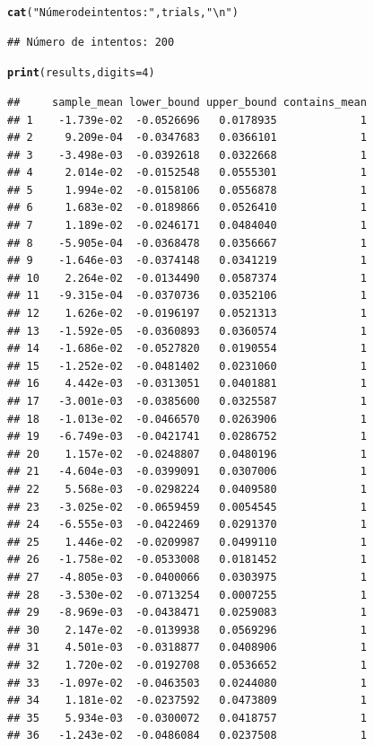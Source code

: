 \documentclass[12pt]{article}\usepackage[]{graphicx}\usepackage[]{xcolor}
\makeatletter
\newcommand{\hlnum}[1]{\textcolor[rgb]{0.686,0.059,0.569}{#1}}%
\newcommand{\hlsng}[1]{\textcolor[rgb]{0.192,0.494,0.8}{#1}}%
\newcommand{\hldef}[1]{\textcolor[rgb]{0.345,0.345,0.345}{#1}}%
\newcommand{\hlkwc}[1]{\textcolor[rgb]{0.333,0.667,0.333}{#1}}%
\newcommand{\hlkwd}[1]{\textcolor[rgb]{0.737,0.353,0.396}{\textbf{#1}}}%
\newenvironment{kframe}{%
 \def\at@end@of@kframe{}%
 \ifinner\ifhmode%
  \def\at@end@of@kframe{\end{minipage}}%
  \begin{minipage}{\columnwidth}%
 \fi\fi%
 \def\FrameCommand##1{\hskip\@totalleftmargin \hskip-\fboxsep
 \colorbox{shadecolor}{##1}\hskip-\fboxsep
     \hskip-\linewidth \hskip-\@totalleftmargin \hskip\columnwidth}%
 \MakeFramed {\advance\hsize-\width
   \@totalleftmargin\z@ \linewidth\hsize
   \@setminipage}}%
 {\par\unskip\endMakeFramed%
 \at@end@of@kframe}
\newenvironment{knitrout}{}{} %
\makeatother
\begin{document}
\begin{knitrout}
\begin{kframe}
\begin{alltt}
\hlkwd{cat}\hldef{(}\hlsng{"Número de intentos:"}\hldef{, trials,} \hlsng{"\textbackslash{}n"}\hldef{)}
\end{alltt}
\begin{verbatim}
## Número de intentos: 200
\end{verbatim}
\begin{alltt}
\hlkwd{print}\hldef{(results,} \hlkwc{digits}\hldef{=} \hlnum{4}\hldef{)}
\end{alltt}
\begin{verbatim}
##     sample_mean lower_bound upper_bound contains_mean
## 1    -1.739e-02  -0.0526696   0.0178935             1
## 2     9.209e-04  -0.0347683   0.0366101             1
## 3    -3.498e-03  -0.0392618   0.0322668             1
## 4     2.014e-02  -0.0152548   0.0555301             1
## 5     1.994e-02  -0.0158106   0.0556878             1
## 6     1.683e-02  -0.0189866   0.0526410             1
## 7     1.189e-02  -0.0246171   0.0484040             1
## 8    -5.905e-04  -0.0368478   0.0356667             1
## 9    -1.646e-03  -0.0374148   0.0341219             1
## 10    2.264e-02  -0.0134490   0.0587374             1
## 11   -9.315e-04  -0.0370736   0.0352106             1
## 12    1.626e-02  -0.0196197   0.0521313             1
## 13   -1.592e-05  -0.0360893   0.0360574             1
## 14   -1.686e-02  -0.0527820   0.0190554             1
## 15   -1.252e-02  -0.0481402   0.0231060             1
## 16    4.442e-03  -0.0313051   0.0401881             1
## 17   -3.001e-03  -0.0385600   0.0325587             1
## 18   -1.013e-02  -0.0466570   0.0263906             1
## 19   -6.749e-03  -0.0421741   0.0286752             1
## 20    1.157e-02  -0.0248807   0.0480196             1
## 21   -4.604e-03  -0.0399091   0.0307006             1
## 22    5.568e-03  -0.0298224   0.0409580             1
## 23   -3.025e-02  -0.0659459   0.0054545             1
## 24   -6.555e-03  -0.0422469   0.0291370             1
## 25    1.446e-02  -0.0209987   0.0499110             1
## 26   -1.758e-02  -0.0533008   0.0181452             1
## 27   -4.805e-03  -0.0400066   0.0303975             1
## 28   -3.530e-02  -0.0713254   0.0007255             1
## 29   -8.969e-03  -0.0438471   0.0259083             1
## 30    2.147e-02  -0.0139938   0.0569296             1
## 31    4.501e-03  -0.0318877   0.0408906             1
## 32    1.720e-02  -0.0192708   0.0536652             1
## 33   -1.097e-02  -0.0463503   0.0244080             1
## 34    1.181e-02  -0.0237592   0.0473809             1
## 35    5.934e-03  -0.0300072   0.0418757             1
## 36   -1.243e-02  -0.0486084   0.0237508             1

\end{verbatim}
\end{kframe}
\end{knitrout}
\end{document}

